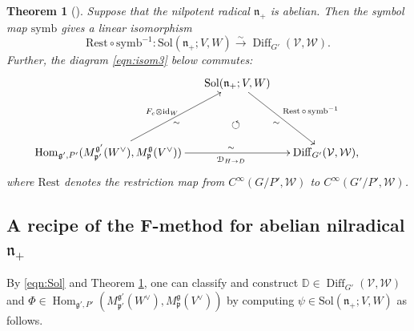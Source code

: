\documentclass[reqno,11pt]{amsart}
\newtheorem{thm}[equation]{Theorem}
\theoremstyle{remark}
\theoremstyle{definition}
\numberwithin{equation}{section}
\newcommand{\fg}{{\mathfrak g}}
\newcommand{\fn}{{\mathfrak n}}
\newcommand{\fp}{{\mathfrak p}}
\newcommand{\Cal}{\mathcal}
\newcommand{\Hom}{\operatorname{Hom}}
\newcommand{\To}{\longrightarrow}
\newcommand{\Mp}{M^{\fg}_{\fp}}
\newcommand{\Mpp}{M^{\fg'}_{\fp'}}
\newcommand{\EuD}{\EuScript{D}}
\newcommand{\Rest}{\mathrm{Rest}}
\newcommand{\bD}{\mathbb{D}}
\begin{document}
\begin{thm}
[{\cite[Cor.\ 4.3]{KP1}}]
\label{thm:abelian}
Suppose that the nilpotent radical
$\mathfrak{n}_+$ is abelian. Then 
the symbol map $\mathrm{symb}$ gives
a linear isomorphism
\begin{equation*}
\Rest \circ\mathrm{symb}^{-1}
\colon 
\mathrm{Sol}(\mathfrak n_+;V,W)
\stackrel{\sim}{\To} 
 \operatorname{Diff}_{G'}(\mathcal V, \mathcal W).
\end{equation*}
Further, the diagram \eqref{eqn:isom3} below commutes:
\begin{equation}\label{eqn:isom3}
\xymatrix@R-=0.7pc@C-=0.5cm{
{}
& 
\mathrm{Sol}(\mathfrak n_+;V,W)
\ar[rddd]_{\sim}^{\;\; \Rest\, \circ \, \mathrm{symb}^{-1}}
&{} \\
&&&\\
&\circlearrowleft{} \\
\operatorname{Hom}_{\mathfrak{g}',P'}(\Mpp(W^\vee),\Mp(V^\vee)) 
  \ar[rr]^{\hspace{25pt}\sim}_{\hspace{25pt}\EuD_{H\to D}}
  \ar[ruuu]_{\sim}^{F_c\otimes\mathrm{id}_W} 
 & {}
 & 
 \operatorname{Diff}_{G'}(\mathcal V, \mathcal W),
}
\end{equation}
where $\Rest$ denotes the restriction map 
from $C^\infty(G/P',\Cal{W})$ to $C^\infty(G'/P',\Cal{W})$.
\end{thm}

\subsection{A recipe of the F-method for abelian nilradical $\fn_+$}
\label{sec:recipe}

By \eqref{eqn:Sol} and Theorem \ref{thm:abelian},
one can classify and construct 
$\bD \in  \operatorname{Diff}_{G'}(\mathcal V, \mathcal W)$ and
$\Phi \in 
\Hom_{\mathfrak{g}',P'}(\Mpp(W^\vee),\Mp(V^\vee))$
by computing $\psi \in \mathrm{Sol}(\mathfrak n_+;V,W)$ as follows.
\vskip 0.1in
\end{document}
